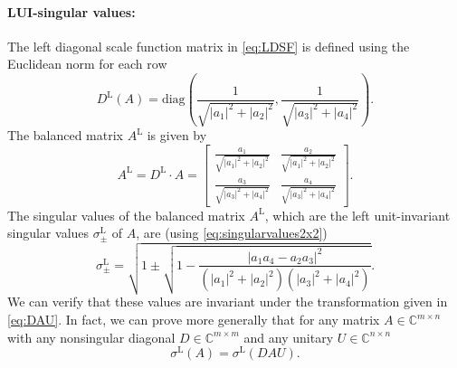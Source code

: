 \documentclass[11pt,a4paper]{article}
\newcommand{\be}{\begin{equation}}
\newcommand{\ee}{\end{equation}}
\begin{document}
\paragraph{LUI-singular values:}
The left diagonal scale function matrix in \cref{eq:LDSF} is defined using the Euclidean norm for each row
\begin{equation}
D^\mathrm{L}{(A)} = \text{diag} \left( \frac{1}{\sqrt{|a_1|^2 + |a_2|^2}}, \frac{1}{\sqrt{|a_3|^2 + |a_4|^2}} \right).
\end{equation}
The balanced matrix \( A^\mathrm{L} \) is given by
\begin{equation}
A^\mathrm{L} = D^\mathrm{L} \cdot A = 
\begin{bmatrix} 
\frac{a_1}{\sqrt{|a_1|^2 + |a_2|^2}} & \frac{a_2}{\sqrt{|a_1|^2 + |a_2|^2}} \\
\frac{a_3}{\sqrt{|a_3|^2 + |a_4|^2}} & \frac{a_4}{\sqrt{|a_3|^2 + |a_4|^2}}
\end{bmatrix}.
\end{equation}
The singular values of the balanced matrix \( A^\mathrm{L} \), which are the left unit-invariant singular values \( \sigma^\mathrm{L}_{\pm} \) of \( A \), are (using \cref{eq:singularvalues2x2})
\begin{equation}\label{eq:lui-2x2}
\sigma^\mathrm{L}_{\pm} = \sqrt{ 1 \pm \sqrt{1 - \frac{|a_1a_4 - a_2a_3|^2}{(|a_1|^2 + |a_2|^2)(|a_3|^2 + |a_4|^2)}}}.
\end{equation}
We can verify that these values are invariant under the transformation given in \cref{eq:DAU}. In fact, we can prove more generally that for any matrix $A\in\mathbb C^{m\times n}$ with any nonsingular diagonal \(D\in\mathbb C^{m\times m}\) and any unitary \(U\in\mathbb C^{n\times n}\)
\be
\sigma^{\mathrm L}(A)=\sigma^{\mathrm L}(DAU).
\ee
\end{document}
